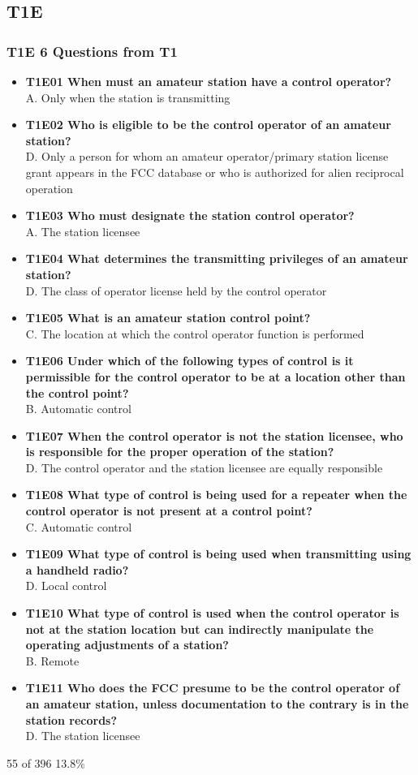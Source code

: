 \documentclass[10pt]{beamer}
\begin{document}
\subsection{T1E}
\begin{frame}
\frametitle{T1E 6 Questions from T1}
\begin{itemize}[<+->]
\tiny
\item\textbf{T1E01 When must an amateur station have a control operator?}\hfil\\A. Only when the station is transmitting
\item\textbf{T1E02 Who is eligible to be the control operator of an amateur station?} \hfil\\D. Only a person for whom an amateur operator/primary station license grant appears in the FCC database or who is authorized for alien reciprocal operation
\item\textbf{T1E03 Who must designate the station control operator?} \hfil\\A. The station licensee
\item\textbf{T1E04 What determines the transmitting privileges of an amateur station?}\hfil\\D. The class of operator license held by the control operator
\item\textbf{T1E05 What is an amateur station control point?} \hfil\\C. The location at which the control operator function is performed
\item\textbf{T1E06 Under which of the following types of control is it permissible for the control operator to be at a location other than the control point?} \hfil\\B. Automatic control
\item\textbf{T1E07 When the control operator is not the station licensee, who is responsible for the proper operation of the station?} \hfil\\D. The control operator and the station licensee are equally responsible
\item\textbf{T1E08 What type of control is being used for a repeater when the control operator is not present at a control point?}\hfil\\C. Automatic control
\item\textbf{T1E09 What type of control is being used when transmitting using a handheld radio?} \hfil\\D. Local control
\item\textbf{T1E10 What type of control is used when the control operator is not at the station location but can indirectly manipulate the operating adjustments of a station?} \hfil\\B. Remote
\item\textbf{T1E11 Who does the FCC presume to be the control operator of an amateur station, unless documentation to the contrary is in the station records?}\hfil\\D. The station licensee
\end{itemize}
\tiny 55 of 396 13.8\%
\end{frame}
\end{document}
